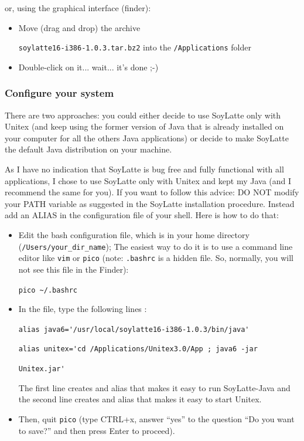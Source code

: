 \bigskip
\noindent or, using the graphical interface (finder):
\begin{itemize}
    \item Move (drag and drop) the archive
    
    \noindent \verb+soylatte16-i386-1.0.3.tar.bz2+ into the \verb+/Applications+ folder
    \item Double-click on it... wait... it's done ;-)
\end{itemize}


\subsubsection{Configure your system}
\noindent There are two approaches: you could either decide to use SoyLatte only
with Unitex (and keep using the former version of Java that is already installed 
on your computer for all the others Java applications) or decide to make SoyLatte 
the default Java distribution on your machine.

\bigskip
\noindent As I have no indication that SoyLatte is bug free and fully
functional with all applications, I chose to use SoyLatte only with 
Unitex and kept my Java (and I recommend the same for you). If you 
want to follow this advice: DO NOT modify your PATH variable as suggested 
in the SoyLatte installation procedure. Instead add an ALIAS in the configuration 
file of your shell. Here is how to do that:
\begin{itemize}
    \item Edit the bash configuration file, which is in your home directory 
    (\verb+/Users/your_dir_name+); The easiest way to do it is to use a command
    line editor like \verb+vim+ or \verb+pico+ (note: \verb+.bashrc+ is a hidden
    file. So, normally, you will not see this file in the Finder):
    
    \bigskip
    \verb+pico ~/.bashrc+
    
    \item In the file, type the following lines :
    
    \bigskip
    \verb+alias java6='/usr/local/soylatte16-i386-1.0.3/bin/java'+
    
    \verb+alias unitex='cd /Applications/Unitex3.0/App ; java6 -jar+
    
    \verb+Unitex.jar'+
    
    \bigskip
    \noindent The first line creates and alias that makes it easy to run
    SoyLatte-Java and the second line creates and alias that makes it easy to start Unitex.
    
    \item Then, quit \verb+pico+ (type CTRL+x, answer ``yes'' to the question
    ``Do you want to save?'' and then press Enter to proceed).
\end{itemize}

